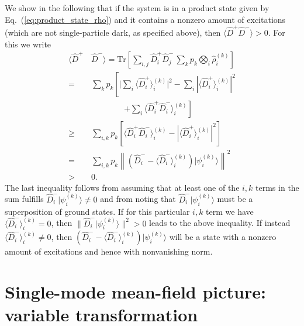 \documentclass[aps,prx,superscriptaddress,twocolumn,notitlepage,nofootinbib,longbibliography]{revtex4-2}
\newcommand{\Tr}{\mathrm{Tr}}
\begin{document}
We show in the following that if the system is in a product state given by Eq.~(\ref{eq:product_state_rho}) and it contains a nonzero amount of excitations (which are not single-particle dark, as specified above), then $\langle \hat{D}^+\hat{D}^- \rangle > 0$. For this we write
{\allowdisplaybreaks
\begin{align}
    \langle \hat{D}^+&\,\hat{D}^- \rangle = \Tr\left[ \sum_{i,j} \hat{D}^+_i\hat{D}^-_j\, \sum_k p_k \bigotimes_i \hat{\rho}^{(k)}_i \right]\nonumber\\
    =&\, \sum_k p_k \left[ \bigg| \sum_{i} \langle \hat{D}^+_i \rangle_i^{(k)} \bigg|^2 - \sum_{i} \left|\langle \hat{D}^+_i \rangle_i^{(k)} \right|^2 \right.
    \nonumber\\ &\, \qquad\qquad \left. + \sum_i \langle \hat{D}^+_i \hat{D}^-_i \rangle_i^{(k)} \right]
    \nonumber\\
    \geq&\, \sum_{i,k} p_k \left[ \langle \hat{D}^+_i \hat{D}^-_i \rangle_i^{(k)} - \left|\langle \hat{D}^+_i \rangle_i^{(k)} \right|^2 \right]
    \nonumber\\
    =&\, \sum_{i,k} p_k \left\| \left( \hat{D}^-_i- \langle \hat{D}^-_i \rangle_i^{(k)} \right) | \psi_i^{(k)} \rangle \right\|^2
    \nonumber\\
    >&\,0.
    \label{eq:inequality_DpDm}
\end{align}
}%
The last inequality follows from assuming that at least one of the $i,k$ terms in the sum fulfills $\hat{D}^-_i| \psi^{(k)}_i \rangle\neq0$ and from noting that $\hat{D}^-_i| \psi^{(k)}_i \rangle$ must be a superposition of ground states.
If for this particular $i,k$ term we have $\langle \hat{D}^-_i \rangle_i^{(k)}=0$, then $\| \hat{D}^-_i| \psi^{(k)}_i \rangle \|^2>0$ leads to the above inequality. If instead $\langle \hat{D}^-_i \rangle_i^{(k)}\neq0$, then $( \hat{D}^-_i- \langle \hat{D}^-_i \rangle_i^{(k)} ) | \psi_i^{(k)} \rangle$ will be a state with a nonzero amount of excitations and hence with nonvanishing norm.
 








\section{Single-mode mean-field picture: variable transformation\label{app:MFtrafo}}
\end{document}
